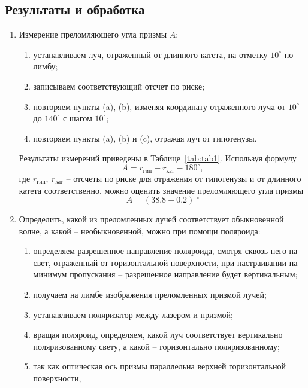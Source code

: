 \documentclass[12pt]{article}
\begin{document}
    \subsection*{Результаты и обработка}
    \begin{enumerate}
        \item Измерение преломляющего угла призмы $A$:
        \begin{enumerate}
            \item устанавливаем луч, отраженный от длинного катета, на отметку $10^{\circ}$ по лимбу;
            \item записываем соответствующий отсчет по риске;
            \item повторяем пункты (a), (b),
            изменяя координату отраженного луча от $10^{\circ}$ до $140^{\circ}$ с шагом $10^{\circ}$;
            \item повторяем пункты (a), (b) и (c), отражая луч от гипотенузы.
        \end{enumerate}
        Результаты измерений приведены в Таблице~\ref{tab:tab1}.
        Используя формулу \[A = r_{\text{гип}} - r_{\text{кат}} - 180^{\circ},\]
        где $r_{\text{гип}},\ r_{\text{кат}}$ -- отсчеты по риске для отражения от гипотенузы
        и от длинного катета соответственно, можно оценить значение преломляющего угла призмы
        \begin{equation*}
            A = (38.8 \pm 0.2)\;^{\circ}
        \end{equation*}
        \item Определить, какой из преломленных лучей соответствует обыкновенной волне,
        а какой -- необыкновенной, можно при помощи поляроида:
        \begin{enumerate}
            \item определяем разрешенное направление поляроида, смотря сквозь него на свет,
            отраженный от горизонтальной поверхности, при настраивании на минимум пропускания --
            разрешенное направление будет вертикальным;
            \item получаем на лимбе изображения преломленных призмой лучей;
            \item устанавливаем поляризатор между лазером и призмой;
            \item вращая поляроид, определяем, какой луч соответствует вертикально поляризованному свету,
            а какой -- горизонтально поляризованному;
            \item так как оптическая ось призмы параллельна верхней горизонтальной поверхности,

\end{enumerate}
\end{enumerate}
\end{document}
